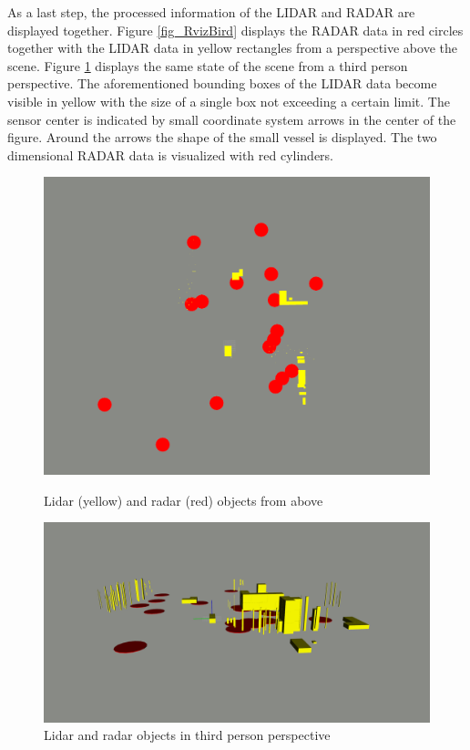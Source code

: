 As a last step, the processed information of the \ac{LIDAR} and \ac{RADAR} are displayed together. Figure \ref{fig_RvizBird} displays the \ac{RADAR} data in red circles together with the \ac{LIDAR} data in yellow rectangles from a perspective above the scene. Figure \ref{fig_RvizThird} displays the same state of the scene from a third person perspective. The aforementioned bounding boxes of the \ac{LIDAR} data become visible in yellow with the size of a single box not exceeding a certain limit. The sensor center is indicated by  small coordinate system arrows in the center of the figure. Around the arrows the shape of the small vessel is displayed. The two dimensional \ac{RADAR} data is visualized with red cylinders. 
 \begin{figure}[!htb]
	\begin{minipage}[t]{0.48\textwidth}
		\centering
		\includegraphics[width=.9\linewidth]{Bilder/Objectmap.png}
		\caption{Lidar (yellow) and radar (red) objects from above}\label{fig_RvizBird}
	\end{minipage}\hfill
	\begin{minipage}[t]{0.48\textwidth}
		\centering
		\includegraphics[width=.9\linewidth]{Bilder/RvizThirdPerson.png}
		\caption{Lidar and radar objects in third person perspective}\label{fig_RvizThird}
	\end{minipage}
\end{figure}
